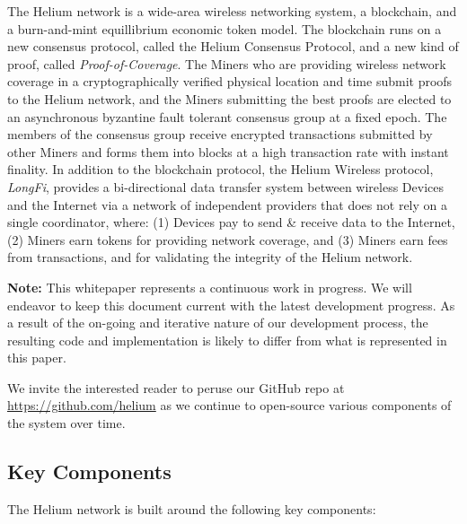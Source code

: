 \documentclass[10pt, nonatbib, nocopyrightspace, reprint]{sigplanconf}
\begin{document}
The Helium network is a wide-area wire\-less net\-working system, a block\-chain, and a burn-and-mint equillibrium economic token model. The blockchain runs on a new consensus protocol, called the Helium Consensus Protocol, and a new kind of proof, called \emph{Proof-of-Coverage}. The Miners who are providing wireless network coverage in a cryptographically verified physical location and time submit proofs to the Helium network, and the Miners submitting the best proofs are elected to an asynchronous byzantine fault tolerant consensus group at a fixed epoch. The members of the consensus group receive encrypted transactions submitted by other Miners and forms them into blocks at a high transaction rate with instant finality. In addition to the blockchain protocol, the Helium Wireless protocol, \emph{LongFi}, provides a bi-directional data transfer system between wireless Devices and the Internet via a network of independent providers that does not rely on a single coordinator, where: (1) Devices pay to send \& receive data to the Internet, (2) Miners earn tokens for providing network coverage, and (3) Miners earn fees from transactions, and for validating the integrity of the Helium network.

\textbf{Note:} This whitepaper represents a continuous work in progress. We will endeavor to keep this document current with the latest development progress. As a result of the on-going and iterative nature of our development process, the resulting code and implementation is likely to differ from what is represented in this paper.

We invite the interested reader to peruse our GitHub repo at \url{https://github.com/helium} as we continue to open-source various components of the system over time.

\subsection{Key Components}

The Helium network is built around the following key components:
\end{document}
